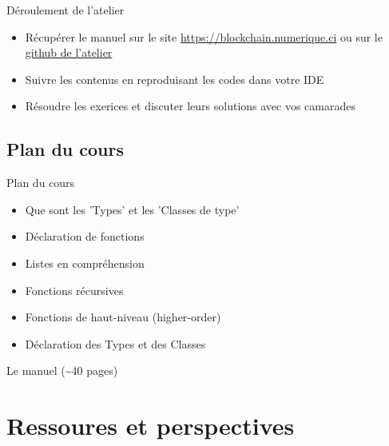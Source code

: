\documentclass[presentation]{beamer}
\begin{document}
\begin{frame}[label={sec:orgcec9595}]{Déroulement de l'atelier}
\begin{itemize}
\item <1>Récupérer le manuel sur le site \url{https://blockchain.numerique.ci} ou sur le \href{manuel.pdf}{github de l'atelier}
\item <2> Suivre les contenus en reproduisant les codes dans votre IDE
\item <3> Résoudre les exerices et discuter leurs solutions avec vos camarades
\end{itemize}
\end{frame}
\subsection{Plan du cours}
\label{sec:org0714f4e}
\begin{frame}[label={sec:org95cd5af}]{}
\begin{block}{Plan du cours}
\begin{itemize}
\item Que sont les 'Types' et les 'Classes de type'
\item Déclaration de fonctions
\item Listes en compréhension
\item Fonctions récursives
\item Fonctions de haut-niveau (higher-order)
\item Déclaration des Types et des Classes
\end{itemize}
\end{block}
\begin{block}{Le manuel (\textasciitilde{}40 pages)}
\end{block}
\end{frame}

\section{Ressoures et perspectives}
\label{sec:org806e676}
\end{document}
